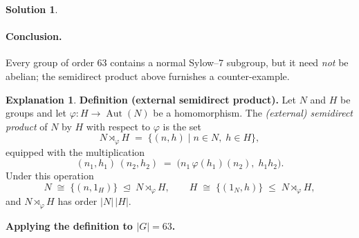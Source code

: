 \documentclass[12pt]{article}
\DeclareMathOperator{\Aut}{Aut}
\theoremstyle{definition} %
\newtheorem{solution}{Solution}
\newtheorem{explanation}{Explanation}
\theoremstyle{plain} %
\begin{document}
\begin{solution}
  \paragraph{Conclusion.}
  Every group of order $63$ contains a normal Sylow–$7$ subgroup, but it
  need \emph{not} be abelian; the semidirect product above furnishes a
  counter-example.
  \end{solution}
  \begin{explanation}
    \textbf{Definition (external semidirect product).}
    Let $N$ and $H$ be groups and let $\varphi:H\to\Aut(N)$ be a
    homomorphism.  
    The \emph{(external) semidirect product} of $N$ by $H$ with respect to
    $\varphi$ is the set
    \[
       N\rtimes_{\!\varphi} H \;=\; \{(n,h)\mid n\in N,\;h\in H\},
    \]
    equipped with the multiplication
    \[
       (n_{1},h_{1})\,(n_{2},h_{2})
         \;=\;
       \bigl(n_{1}\,\varphi(h_{1})(n_{2}),\;h_{1}h_{2}\bigr).
    \]
    Under this operation
    \[
       N\;\cong\;\{(n,1_{H})\}\;\trianglelefteq\;N\rtimes_{\!\varphi}H,
       \qquad
       H\;\cong\;\{(1_{N},h)\}\;\le\;N\rtimes_{\!\varphi}H,
    \]
    and $N\rtimes_{\!\varphi}H$ has order $|N|\,|H|$.
    
    \bigskip
    \textbf{Applying the definition to $|G|=63$.}
    

\end{explanation}
\end{document}
